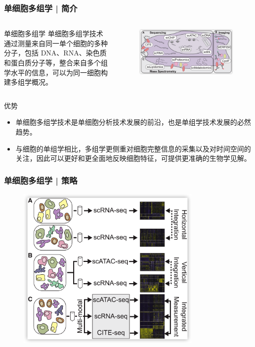\documentclass[11pt]{ctexbeamer}
\begin{document}
\begin{frame}
	\frametitle{单细胞多组学 | 简介}
	\begin{columns}
	\begin{block}{单细胞多组学}
		单细胞多组学技术通过测量来自同一单个细胞的多种分子，包括 DNA、RNA、染色质和蛋白质分子等，整合来自多个组学水平的信息，可以为同一细胞构建多组学概况。
	\end{block}
	\begin{figure}
	\includegraphics[width=\textwidth]{multimodel_02.png}
\end{figure}
\end{columns}
    \begin{block}{优势}
    	\begin{itemize}
    		\item 单细胞多组学技术是单细胞分析技术发展的前沿，也是单组学技术发展的必然趋势。
    		\item 与细胞的单组学相比，多组学更侧重对细胞完整信息的采集以及对时间空间的关注，因此可以更好和更全面地反映细胞特征，可提供更准确的生物学见解。
    	\end{itemize}
    \end{block}
\end{frame}

\begin{frame}
	\frametitle{单细胞多组学 | 策略}
	\begin{figure}
		\includegraphics[width=0.8\textwidth]{multimodel_03.png}
	\end{figure}
\end{frame}
\end{document}
